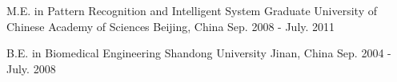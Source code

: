 

\begin{cventries}

  \cventry
   {M.E. in Pattern Recognition and Intelligent System}
   {Graduate University of Chinese Academy of Sciences}
   {Beijing, China}
   {Sep. 2008 - July. 2011}
   {}
   
  \cventry
    {B.E. in Biomedical Engineering} %
    {Shandong University} %
    {Jinan, China} %
    {Sep. 2004 - July. 2008} %
    {}

\end{cventries}
